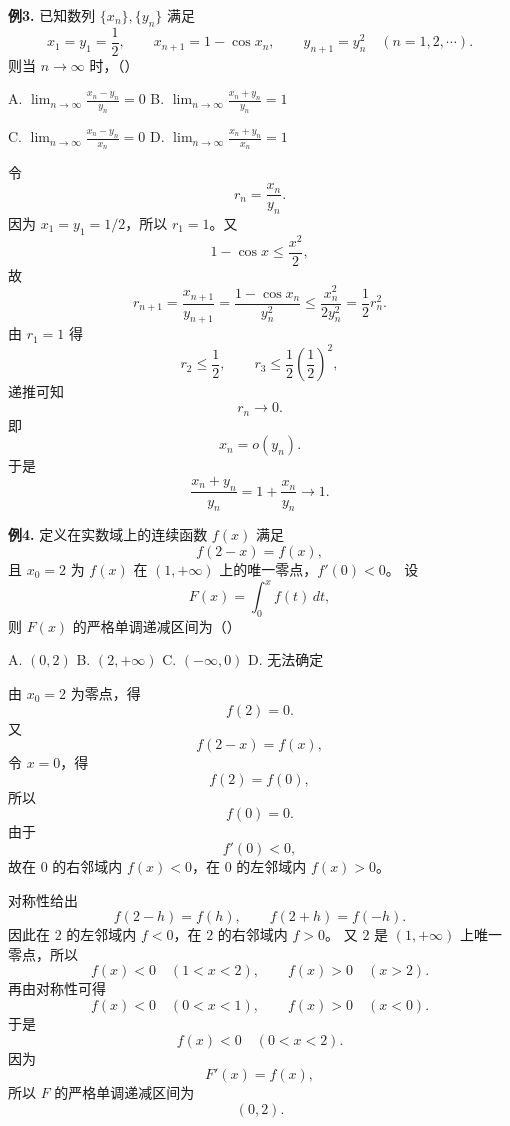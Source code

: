 \begin{problemblock}
\textbf{例3.} 已知数列 \(\{x_n\},\{y_n\}\) 满足
\[
x_1=y_1=\frac12,\qquad x_{n+1}=1-\cos x_n,\qquad y_{n+1}=y_n^2
\quad (n=1,2,\cdots).
\]
则当 \(n\to\infty\) 时，（\quad）

A. \(\displaystyle \lim_{n\to\infty}\frac{x_n-y_n}{y_n}=0\)
\quad
B. \(\displaystyle \lim_{n\to\infty}\frac{x_n+y_n}{y_n}=1\)

C. \(\displaystyle \lim_{n\to\infty}\frac{x_n-y_n}{x_n}=0\)
\quad
D. \(\displaystyle \lim_{n\to\infty}\frac{x_n+y_n}{x_n}=1\)
\end{problemblock}
\begin{solutionblock}
令
\[
r_n=\frac{x_n}{y_n}.
\]
因为 \(x_1=y_1=1/2\)，所以 \(r_1=1\)。又
\[
1-\cos x\le \frac{x^2}{2},
\]
故
\[
r_{n+1}
=\frac{x_{n+1}}{y_{n+1}}
=\frac{1-\cos x_n}{y_n^2}
\le \frac{x_n^2}{2y_n^2}
=\frac12 r_n^2.
\]
由 \(r_1=1\) 得
\[
r_2\le\frac12,\qquad r_3\le\frac12\left(\frac12\right)^2,
\]
递推可知
\[
r_n\to0.
\]
即
\[
x_n=o(y_n).
\]
于是
\[
\frac{x_n+y_n}{y_n}=1+\frac{x_n}{y_n}\to1.
\]
\end{solutionblock}

\begin{problemblock}
\textbf{例4.} 定义在实数域上的连续函数 \(f(x)\) 满足
\[
f(2-x)=f(x),
\]
且 \(x_0=2\) 为 \(f(x)\) 在 \((1,+\infty)\) 上的唯一零点，\(f'(0)<0\)。
设
\[
F(x)=\int_0^x f(t)\,dt,
\]
则 \(F(x)\) 的严格单调递减区间为（\quad）

A. \((0,2)\)
\quad B. \((2,+\infty)\)
\quad C. \((-\infty,0)\)
\quad D. 无法确定
\end{problemblock}
\begin{solutionblock}
由 \(x_0=2\) 为零点，得
\[
f(2)=0.
\]
又
\[
f(2-x)=f(x),
\]
令 \(x=0\)，得
\[
f(2)=f(0),
\]
所以
\[
f(0)=0.
\]
由于
\[
f'(0)<0,
\]
故在 \(0\) 的右邻域内 \(f(x)<0\)，在 \(0\) 的左邻域内 \(f(x)>0\)。

对称性给出
\[
f(2-h)=f(h),\qquad f(2+h)=f(-h).
\]
因此在 \(2\) 的左邻域内 \(f<0\)，在 \(2\) 的右邻域内 \(f>0\)。
又 \(2\) 是 \((1,+\infty)\) 上唯一零点，所以
\[
f(x)<0\quad (1<x<2),\qquad f(x)>0\quad (x>2).
\]
再由对称性可得
\[
f(x)<0\quad (0<x<1),\qquad f(x)>0\quad (x<0).
\]
于是
\[
f(x)<0\quad (0<x<2).
\]
因为
\[
F'(x)=f(x),
\]
所以 \(F\) 的严格单调递减区间为
\[
(0,2).
\]
\end{solutionblock}

